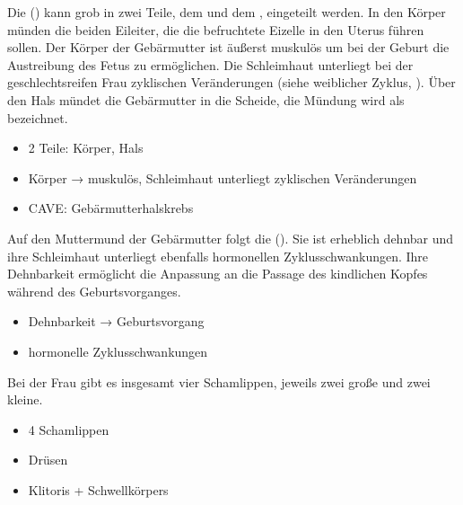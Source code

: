 {%
Die  () kann grob in zwei Teile,
dem  und dem  , eingeteilt werden.
In den Körper münden die beiden Eileiter, die die
befruchtete Eizelle in den Uterus führen sollen.
Der Körper der Gebärmutter ist äußerst muskulös um bei der
Geburt die Austreibung des Fetus zu ermöglichen.
Die Schleimhaut unterliegt bei der geschlechtsreifen Frau
zyklischen Veränderungen (siehe weiblicher Zyklus,
).
Über den Hals mündet die Gebärmutter in die Scheide, die
Mündung wird als  bezeichnet.
%
}
{
\begin{itemize}
  \item 2 Teile: Körper, Hals
  \item Körper → muskulös, Schleimhaut unterliegt zyklischen Veränderungen
  \item CAVE: Gebärmutterhalskrebs
\end{itemize}
}{}{}{}


{%
Auf den Muttermund der Gebärmutter folgt die  (). 
%
Sie ist erheblich dehnbar und ihre Schleimhaut unterliegt ebenfalls
hormonellen Zyklusschwankungen. Ihre Dehnbarkeit ermöglicht
die Anpassung an die Passage des kindlichen Kopfes während
des Geburtsvorganges.
}
{
\begin{itemize}
  \item Dehnbarkeit → Geburtsvorgang
  \item hormonelle Zyklusschwankungen
\end{itemize}
}{}{}{}


{%
Bei der Frau gibt es insgesamt vier Schamlippen, jeweils
zwei große und zwei kleine. 
}
{
\begin{itemize}
  \item 4 Schamlippen
  \item Drüsen
  \item Klitoris + Schwellkörpers
\end{itemize}
}{}{}{}


